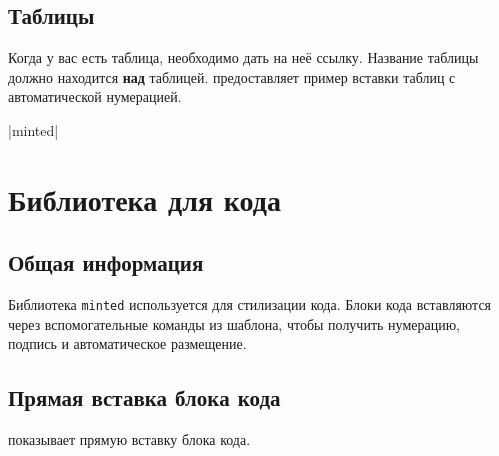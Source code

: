 \documentclass[a4paper,12pt]{report}
\begin{document}
\subsection{Таблицы}

Когда у вас есть таблица, необходимо дать на неё ссылку.
Название таблицы должно находится \textbf{над} таблицей.
 предоставляет пример вставки таблиц с автоматической нумерацией.


|minted|

\section[Библиотека minted для кода]{Библиотека  для кода}

\subsection{Общая информация}

Библиотека \verb|minted| используется для стилизации кода.
Блоки кода вставляются через вспомогательные команды из шаблона,
чтобы получить нумерацию, подпись и автоматическое размещение.

\subsection{Прямая вставка блока кода}

 показывает прямую вставку блока кода.
\end{document}
